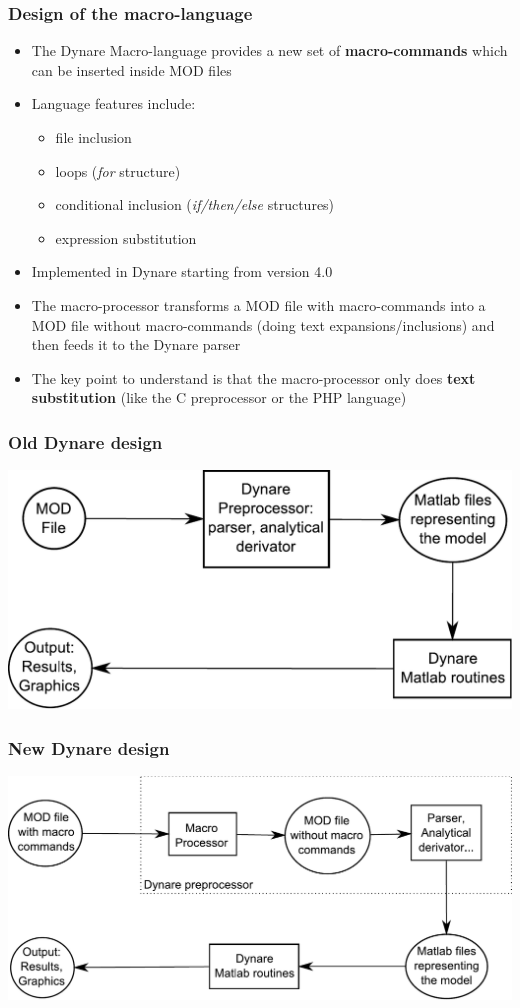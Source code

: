 \documentclass{beamer}
\begin{document}
\begin{frame}
  \frametitle{Design of the macro-language}
  \begin{itemize}
  \item The Dynare Macro-language provides a new set of \textbf{macro-commands} which can be inserted inside MOD files
  \item Language features include:
    \begin{itemize}
    \item file inclusion
    \item loops (\textit{for} structure)
    \item conditional inclusion (\textit{if/then/else} structures)
    \item expression substitution
    \end{itemize}
  \item Implemented in Dynare starting from version 4.0
  \item The macro-processor transforms a MOD file with macro-commands into a MOD file without macro-commands (doing text expansions/inclusions) and then feeds it to the Dynare parser
  \item The key point to understand is that the macro-processor only does \textbf{text substitution} (like the C preprocessor or the PHP language)
  \end{itemize}
\end{frame}

\begin{frame}
  \frametitle{Old Dynare design}
  \includegraphics[width=0.95\linewidth]{old-design.pdf}
\end{frame}

\begin{frame}
  \frametitle{New Dynare design}
  \includegraphics[width=0.95\linewidth]{new-design.pdf}
\end{frame}
\end{document}

